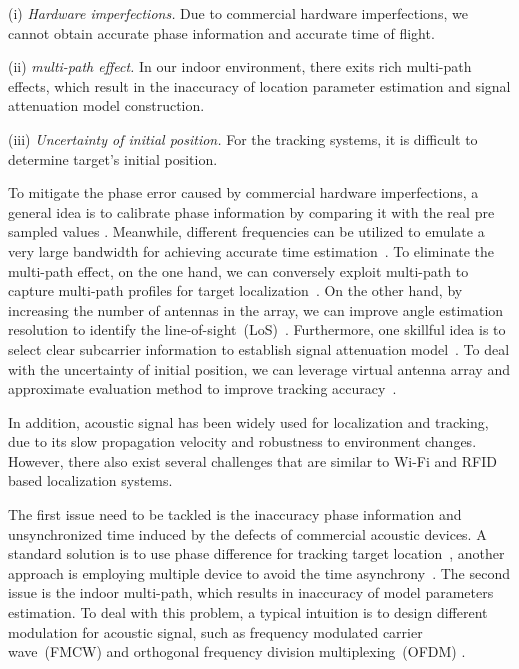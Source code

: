 (i) \emph{Hardware imperfections.} Due to commercial hardware imperfections, we cannot obtain accurate phase information and accurate time of flight.

(ii) \emph{multi-path effect.} In our indoor environment, there exits rich  multi-path effects, which result in the inaccuracy of location parameter estimation and signal attenuation model construction.

(iii) \emph{Uncertainty of initial position.} For the tracking systems, it is difficult to determine target's initial position.


 To mitigate the phase error caused by commercial hardware imperfections, a general idea is to calibrate phase information by comparing it with the real pre sampled values \cite{Wang2016D}. Meanwhile, different frequencies can be utilized to emulate a very large bandwidth for achieving accurate time estimation~\cite{RFind}. To eliminate the multi-path effect, on the one hand, we can conversely exploit multi-path to capture multi-path profiles for target localization~\cite{PinIt}. On the other hand, by increasing the number of antennas in the array, we can improve angle estimation resolution to identify the line-of-sight~(LoS)~\cite{Arraytrack, Spotfi}. Furthermore, one skillful idea is to select clear subcarrier information to establish signal attenuation model~\cite{wang2016lifs}. To deal with the uncertainty of initial position, we can leverage virtual antenna array and approximate evaluation method to improve tracking accuracy~\cite{Tagoram}.

In addition, acoustic signal has been widely used for localization and tracking, due to its slow propagation velocity and robustness to environment changes. However, there also exist several challenges that are similar to Wi-Fi and RFID based localization systems.

The first issue need to be tackled is the inaccuracy phase information and unsynchronized time induced by the defects of commercial acoustic devices. A standard solution is to use phase difference for tracking target location~\cite{LLAP}, another approach is employing multiple device to avoid the time asynchrony~\cite{BeepBeep}.  The second issue is the indoor multi-path, which results in inaccuracy of model parameters estimation. To deal with this problem, a typical intuition is to design different modulation for acoustic signal, such as frequency modulated carrier wave~(FMCW) and orthogonal frequency division multiplexing~(OFDM) \cite{CAT,STRATA}.




